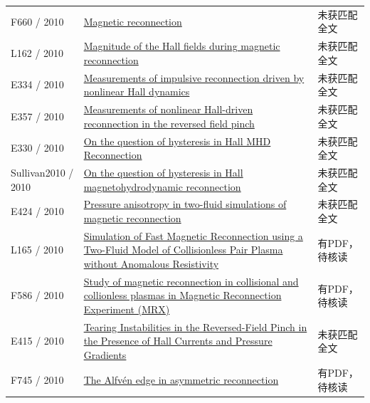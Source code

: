 \documentclass[UTF8,a4paper,11pt,openany,fontset=fandol]{ctexbook}
\begin{document}
\begin{longtable}{P{24mm}P{97mm}P{27mm}}
F660 / 2010 & \href{https://doi.org/10.1103/revmodphys.82.603}{Magnetic reconnection} & 未获匹配全文\\

L162 / 2010 & \href{https://doi.org/10.1029/2009gl041941}{Magnitude of the Hall fields during magnetic reconnection} & 未获匹配全文\\

E334 / 2010 & \href{https://doi.org/10.1063/1.3521336}{Measurements of impulsive reconnection driven by nonlinear Hall dynamics} & 未获匹配全文\\

E357 / 2010 & \href{http://absimage.aps.org/image/DPP10/MWS_DPP10-2010-000419.pdf}{Measurements of nonlinear Hall-driven reconnection in the reversed field pinch} & 未获匹配全文\\

E330 / 2010 & \href{http://absimage.aps.org/image/DPP10/MWS_DPP10-2010-001121.pdf}{On the question of hysteresis in Hall MHD Reconnection} & 未获匹配全文\\

Sullivan2010 / 2010 & \href{https://doi.org/10.1063/1.3518752}{On the question of hysteresis in Hall magnetohydrodynamic reconnection} & 未获匹配全文\\

E424 / 2010 & \href{https://ui.adsabs.harvard.edu/abs/2010APS..DPPCP9139J/abstract}{Pressure anisotropy in two-fluid simulations of magnetic reconnection} & 未获匹配全文\\

L165 / 2010 & \href{https://doi.org/10.48550/arxiv.1010.0222}{Simulation of Fast Magnetic Reconnection using a Two-Fluid Model of Collisionless Pair Plasma without Anomalous Resistivity} & 有PDF，待核读\\

F586 / 2010 & \href{https://doi.org/10.1017/s1743921311006508}{Study of magnetic reconnection in collisional and collionless plasmas in Magnetic Reconnection Experiment (MRX)} & 有PDF，待核读\\

E415 / 2010 & \href{http://absimage.aps.org/image/DPP10/MWS_DPP10-2010-001620.pdf}{Tearing Instabilities in the Reversed-Field Pinch in the Presence of Hall Currents and Pressure Gradients} & 未获匹配全文\\

F745 / 2010 & \href{https://doi.org/10.5194/angeo-28-1327-2010}{The Alfvén edge in asymmetric reconnection} & 有PDF，待核读\\


\end{longtable}
\end{document}
